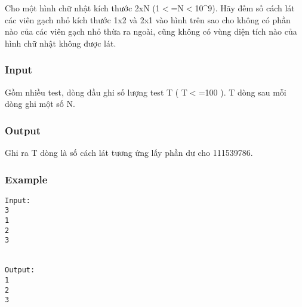 



   Cho một hình chữ nhật kích thước 2xN (1$<$=N$<$10\textasciicircum9). Hãy đếm số cách lát các viên gạch nhỏ kích thước 1x2 và 2x1 vào hình trên sao cho không có phần nào của các viên gạch nhỏ thừa ra ngoài, cũng không có vùng diện tích nào của hình chữ nhật không được lát.  

\subsubsection{   Input  }

   Gồm nhiều test, dòng đầu ghi số lượng test T ( T$<$=100 ). T dòng sau mỗi dòng ghi một số N.  

\subsubsection{   Output  }

   Ghi ra T dòng là số cách lát tương ứng lấy phần dư cho 111539786.  

\subsubsection{   Example  }
\begin{verbatim}
Input:
3
1
2
3


Output:
1
2
3

\end{verbatim}